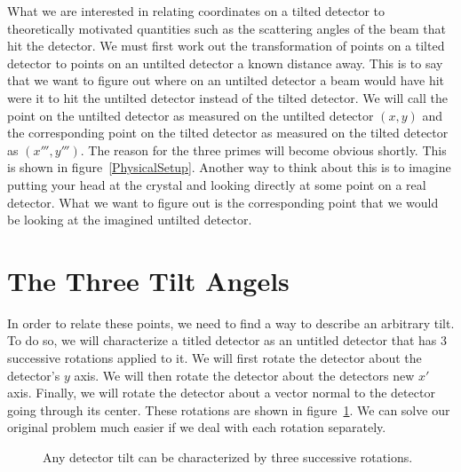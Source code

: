 What we are interested in relating
coordinates on a tilted detector 
to theoretically motivated quantities such as 
the scattering angles of the beam that hit the
detector. We must first work
out the transformation of points on a tilted detector
to points on an untilted detector a known distance
away. This is to say
that we want to figure out where on an untilted 
detector a beam would have hit were it to hit
the untilted detector instead of the tilted detector.
We will call the point on the untilted detector
as measured on the untilted detector $(x,y)$ 
and the corresponding point on the tilted detector
as measured on the tilted detector as $(x''',y''')$. 
The reason for the three primes will become obvious
shortly. This is shown in 
figure~\ref{PhysicalSetup}. Another way to think
about this is to imagine putting your 
head at the crystal and looking directly 
at some point on a real
detector. What we want to figure out
is the corresponding point that we would be looking
at the imagined untilted detector.

\begin{SCfigure}[1][htbp]
    \centering
    
    \caption{Here, the detector 
    is titled with respect to the 
    incoming beam. We will call a point on 
    the tilted detector $(x''',y''')$. We are interested in 
    relating this point to the point $(x,y)$ on an imagined 
    untilted detector.}
    \label{PhysicalSetup}
\end{SCfigure}

\section{The Three Tilt Angels}
\index{$\alpha$} \index{$\beta$}  
In order to relate these points, we need to find a way to 
describe an arbitrary tilt. To do so, we will 
characterize a titled detector as an untitled detector
that has 3 successive rotations applied to it. 
We will first rotate the detector about the detector's $y$
axis. We will then rotate the detector about the detectors
new $x'$ axis. Finally, we will rotate the detector about
a vector normal to the detector going through its center.
These rotations are shown in figure~\ref{ThreeTilts}.
We can solve our original problem much easier if we deal
with each rotation separately.

\begin{figure}[htb]
    \centering
    \;\;
    \;\;
    \caption{Any detector tilt can be characterized 
    by three successive rotations.}
    \label{ThreeTilts}
\end{figure}


